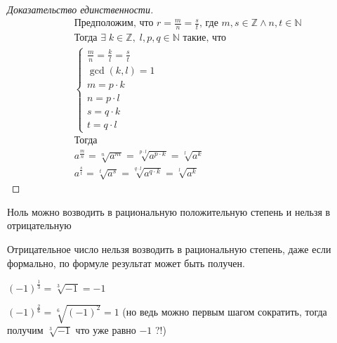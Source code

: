 \begin{proof}[Доказательство единственности]
    \begin{align*}
        &\text{Предположим, что } r = \frac{m}{n} = \frac{s}{t} \text{, где } m,s \in \mathbb{Z} \land n,t \in \mathbb{N} \\
        &\text{Тогда } \exists \; k \in \mathbb{Z}, \; l,p,q \in \mathbb{N} \text{ такие, что } \\
        &\left\{\begin{array}{l}
            \frac{m}{n} = \frac{k}{l} = \frac{s}{t} \\
            \gcd(k,l) = 1 \\
            m = p \cdot k \\
            n = p \cdot l \\
            s = q \cdot k \\
            t = q \cdot l
        \end{array}\right. \\
        &\text{Тогда } \\
        &a^{\frac{m}{n}} = \sqrt[n]{a^m} = \sqrt[p \cdot l]{a^{p \cdot k}} = \sqrt[l]{a^k} \\
        &a^{\frac{s}{t}} = \sqrt[t]{a^s} = \sqrt[q \cdot l]{a^{q \cdot k}} = \sqrt[l]{a^k}
    \end{align*}
\end{proof}

\begin{remark}
    Ноль можно возводить в рациональную положительную степень и нельзя в отрицательную
\end{remark}

\begin{remark}
    Отрицательное число нельзя возводить в рациональную степень, даже если формально, по формуле результат может быть получен.
\end{remark}

\begin{example}
    $(-1)^\frac{1}{3} = \sqrt[3]{-1} = -1$
\end{example}

\begin{example}
    $(-1)^\frac{2}{6} = \sqrt[6]{(-1)^2} = 1$ (но ведь можно первым шагом сократить, тогда получим $\sqrt[3]{-1}$ что уже равно $-1$ ?!)
\end{example}